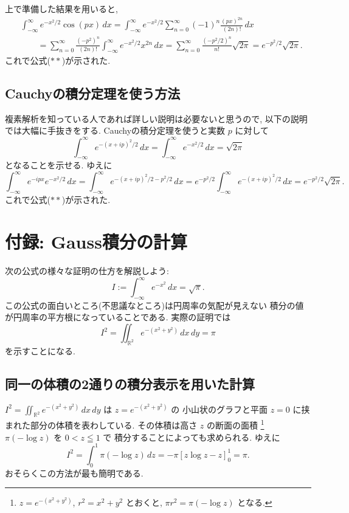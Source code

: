 \documentclass[12pt,twoside]{jarticle}
\newcommand\R{{\mathbb R}} %
\theoremstyle{jplain}
\theoremstyle{jplain}
\theoremstyle{jplain}
\numberwithin{theorem}{section}
\numberwithin{equation}{section}
\numberwithin{figure}{section}
\numberwithin{table}{section}
\begin{document}
上で準備した結果を用いると, 
\begin{align*}
&
\int_{-\infty}^\infty e^{-x^2/2}\cos(px)\,dx
=
\int_{-\infty}^\infty e^{-x^2/2}
\sum_{n=0}^\infty (-1)^n\frac{(px)^{2n}}{(2n)!}
\,dx
\\ & \qquad
=
\sum_{n=0}^\infty \frac{(-p^2)^n}{(2n)!}
\int_{-\infty}^\infty e^{-x^2/2}x^{2n}\,dx
=
\sum_{n=0}^\infty \frac{(-p^2/2)^n}{n!}\sqrt{2\pi}
=
e^{-p^2/2}\sqrt{2\pi}.
\end{align*}
これで公式($**$)が示された.


\subsection{Cauchyの積分定理を使う方法}

複素解析を知っている人であれば詳しい説明は必要ないと思うので, 
以下の説明では大幅に手抜きをする.
Cauchyの積分定理を使うと実数 $p$ に対して
\[
\int_{-\infty}^\infty e^{-(x+ip)^2/2}\,dx 
=\int_{-\infty}^\infty e^{-x^2/2}\,dx
=\sqrt{2\pi} 
\]
となることを示せる. ゆえに
\[
\int_{-\infty}^\infty e^{-ipx}e^{-x^2/2}\,dx
=
\int_{-\infty}^\infty e^{-(x+ip)^2/2-p^2/2}\,dx
=
e^{-p^2/2}\int_{-\infty}^\infty e^{-(x+ip)^2/2}\,dx
=
e^{-p^2/2}\sqrt{2\pi}.
\]
これで公式($**$)が示された.


\section{付録: Gauss積分の計算}

次の公式の様々な証明の仕方を解説しよう:
\[
 I:=\int_{-\infty}^\infty e^{-x^2}\,dx = \sqrt{\pi}.
\]
この公式の面白いところ(不思議なところ)は円周率の気配が見えない
積分の値が円周率の平方根になっていることである.
実際の証明では
\[
 I^2 = \iint_{\R^2} e^{-(x^2+y^2)}\,dx\,dy = \pi
\]
を示すことになる.


\subsection{同一の体積の2通りの積分表示を用いた計算}

$I^2=\iint_{\R^2}e^{-(x^2+y^2)}\,dx\,dy$ は $z=e^{-(x^2+y^2)}$ の
小山状のグラフと平面 $z=0$ に挟まれた部分の体積を表わしている.
その体積は高さ $z$ の断面の面積%
\footnote{$z=e^{-(x^2+y^2)}$, $r^2=x^2+y^2$ とおくと, 
$\pi r^2=\pi(-\log z)$ となる.} %
$\pi(-\log z)$ を $0<z\leqq 1$ で
積分することによっても求められる.  ゆえに
\[
I^2=\int_0^1 \pi(-\log z)\,dz = -\pi[z\log z-z]_0^1 = \pi.
\]
おそらくこの方法が最も簡明である.
\end{document}

